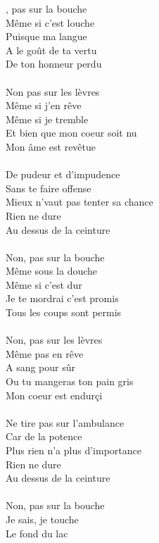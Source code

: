 

, pas sur la bouche
\\Même si c'est louche
\\Puisque ma langue
\\A le goût de ta vertu
\\De ton honneur perdu
\\\\Non pas sur les lèvres
\\Même si j'en rêve
\\Même si je tremble
\\Et bien que mon coeur soit nu
\\Mon âme est revêtue
\\\\De pudeur et d'impudence
\\Sans te faire offense
\\Mieux n'vaut pas tenter sa chance
\\Rien ne dure
\\Au dessus de la ceinture
\\\\Non, pas sur la bouche
\\Même sous la douche
\\Même si c'est dur
\\Je te mordrai c'est promis
\\Tous les coups sont permis
\\\\Non, pas sur les lèvres
\\Même pas en rêve
\\A sang pour sûr
\\Ou tu mangeras ton pain gris
\\Mon coeur est endurçi
\\\\Ne tire pas sur l'ambulance
\\Car de la potence
\\Plus rien n'a plus d'importance
\\Rien ne dure
\\Au dessus de la ceinture
\\\\Non, pas sur la bouche
\\Je sais, je touche
\\Le fond du lac

